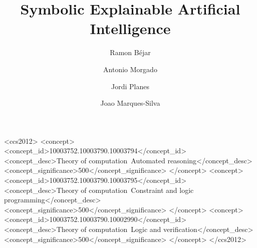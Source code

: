 \title[Symbolic Explainable AI]{Symbolic Explainable Artificial Intelligence}


\author{Ramon B\'{e}jar}
\orcid{}


\author{Antonio Morgado}
\orcid{}


\author{Jordi Planes}
\orcid{}


\author{Joao Marques-Silva}


\renewcommand{\shortauthors}{Bejar, Morgado, Planes, Marques-Silva}



\begin{CCSXML}
<ccs2012>
<concept>
<concept_id>10003752.10003790.10003794</concept_id>
<concept_desc>Theory of computation~Automated reasoning</concept_desc>
<concept_significance>500</concept_significance>
</concept>
<concept>
<concept_id>10003752.10003790.10003795</concept_id>
<concept_desc>Theory of computation~Constraint and logic programming</concept_desc>
<concept_significance>500</concept_significance>
</concept>
<concept>
<concept_id>10003752.10003790.10002990</concept_id>
<concept_desc>Theory of computation~Logic and verification</concept_desc>
<concept_significance>500</concept_significance>
</concept>
</ccs2012>
\end{CCSXML}

